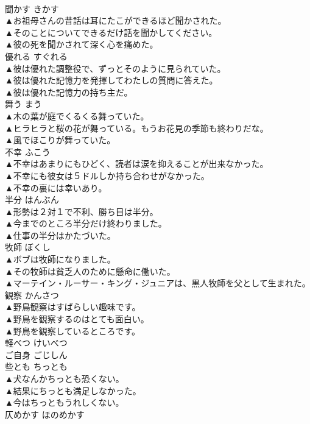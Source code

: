 \documentclass[8pt]{extreport}
\begin{document}
\begin{CJK}{UTF8}{min}
\\	聞かす	きかす	
\\	▲お祖母さんの昔話は耳にたこができるほど聞かされた。 
\\	▲そのことについてできるだけ話を聞かしてください。 
\\	▲彼の死を聞かされて深く心を痛めた。 
\\	優れる	すぐれる	
\\	▲彼は優れた調整役で、ずっとそのように見られていた。 
\\	▲彼は優れた記憶力を発揮してわたしの質問に答えた。 
\\	▲彼は優れた記憶力の持ち主だ。 
\\	舞う	まう	
\\	▲木の葉が庭でくるくる舞っていた。 
\\	▲ヒラヒラと桜の花が舞っている。もうお花見の季節も終わりだな。 
\\	▲風でほこりが舞っていた。 
\\	不幸	ふこう	
\\	▲不幸はあまりにもひどく、読者は涙を抑えることが出来なかった。 
\\	▲不幸にも彼女は５ドルしか持ち合わせがなかった。 
\\	▲不幸の裏には幸いあり。 
\\	半分	はんぶん	
\\	▲形勢は２対１で不利、勝ち目は半分。 
\\	▲今までのところ半分だけ終わりました。 
\\	▲仕事の半分はかたづいた。 
\\	牧師	ぼくし	
\\	▲ボブは牧師になりました。 
\\	▲その牧師は貧乏人のために懸命に働いた。 
\\	▲マーテイン・ルーサー・キング・ジュニアは、黒人牧師を父として生まれた。 
\\	観察	かんさつ	
\\	▲野鳥観察はすばらしい趣味です。 
\\	▲野鳥を観察するのはとても面白い。 
\\	▲野鳥を観察しているところです。 
\\	軽べつ	けいべつ	
\\	ご自身	ごじしん	
\\	些とも	ちっとも	
\\	▲犬なんかちっとも恐くない。 
\\	▲結果にちっとも満足しなかった。 
\\	▲今はちっともうれしくない。 
\\	仄めかす	ほのめかす	

\end{CJK}
\end{document}

